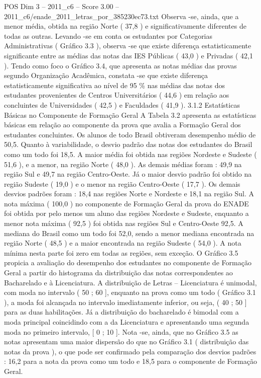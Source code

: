 \begin{textsample}{POS Dim 3 – 2011\_c6 – Score 3.00 – 2011\_c6/enade\_2011\_letras\_por\_385230ec73.txt}
Observa -se, ainda, que a menor média, obtida na região Norte ( 37,8 ) e significativamente diferentes de todas as outras.
Levando -se em conta os estudantes por Categorias Administrativas ( Gráfico 3.3 ), observa -se que existe diferença estatisticamente significante entre as médias das notas das IES Públicas ( 43,0 ) e Privadas ( 42,1 ).
Tendo como foco o Gráfico 3.4, que apresenta as notas médias das provas segundo Organização Acadêmica, constata -se que existe diferença estatisticamente significativa ao nível de 95 \% nas médias das notas dos estudantes provenientes de Centros Universitários ( 44,6 ) em relação aos concluintes de Universidades ( 42,5 ) e Faculdades ( 41,9 ). 3.1.2 Estatísticas Básicas no Componente de Formação Geral A Tabela 3.2 apresenta as estatísticas básicas em relação ao componente da prova que avalia a Formação Geral dos estudantes concluintes.
Os alunos de todo Brasil obtiveram desempenho médio de 50,5.
Quanto à variabilidade, o desvio padrão das notas dos estudantes do Brasil como um todo foi 18,5.
A maior média foi obtida nas regiões Nordeste e Sudeste ( 51,6 ), e a menor, na região Norte ( 48,0 ).
As demais médias foram : 49,9 na região Sul e 49,7 na região Centro-Oeste.
Já o maior desvio padrão foi obtido na região Sudeste ( 19,0 ) e o menor na região Centro-Oeste ( 17,7 ).
Os demais desvios padrões foram : 18,4 nas regiões Norte e Nordeste e 18,1 na região Sul.
A nota máxima ( 100,0 ) no componente de Formação Geral da prova do ENADE foi obtida por pelo menos um aluno das regiões Nordeste e Sudeste, enquanto a menor nota máxima ( 92,5 ) foi obtida nas regiões Sul e Centro-Oeste 92,5.
A mediana do Brasil como um todo foi 52,0, sendo a menor mediana encontrada na região Norte ( 48,5 ) e a maior encontrada na região Sudeste ( 54,0 ).
A nota mínima nesta parte foi zero em todas as regiões, sem exceção.
O Gráfico 3.5 propicia a avaliação do desempenho dos estudantes no componente de Formação Geral a partir do histograma da distribuição das notas correspondentes ao Bacharelado e à Licenciatura.
A distribuição de Letras – Licenciatura é unimodal, com moda no intervalo ( 50 ; 60 ], enquanto na prova como um todo ( Gráfico 3.1 ), a moda foi alcançada no intervalo imediatamente inferior, ou seja, ( 40 ; 50 ] para as duas habilitações.
Já a distribuição do bacharelado é bimodal com a moda principal coincidindo com a da Licenciatura e apresentando uma segunda moda no primeiro intervalo, [ 0 ; 10 ].
Nota -se, ainda, que no Gráfico 3.5 as notas apresentam uma maior dispersão do que no Gráfico 3.1 ( distribuição das notas da prova ), o que pode ser confirmado pela comparação dos desvios padrões : 16,2 para a nota da prova como um todo e 18,5 para o componente de Formação Geral.

\end{textsample}
